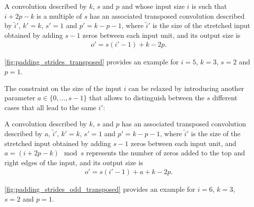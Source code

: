 \begin{relationship}\label{rel:padding_strides_transposed}
    A convolution described by $k$, $s$ and $p$ and whose
    input size $i$ is such that $i + 2p - k$ is a multiple of $s$ has an
    associated transposed convolution described by $\tilde{i}'$, $k' = k$, $s'
    = 1$ and $p' = k - p - 1$, where $\tilde{i}'$ is the size of the stretched
    input obtained by adding $s - 1$ zeros between each input unit, and its
    output size is
    \begin{equation*}
    \begin{split}
        o' = s (i' - 1) + k - 2p.
    \end{split}
    \end{equation*}
\end{relationship}

\noindent\autoref{fig:padding_strides_transposed} provides an example for $i =
5$, $k = 3$, $s = 2$ and $p = 1$.

The constraint on the size of the input $i$ can be relaxed by introducing
another parameter $a \in \{0, \ldots, s - 1\}$ that allows to distinguish
between the $s$ different cases that all lead to the same $i'$:

\begin{relationship}\label{rel:padding_strides_transposed_odd}
    A convolution described by $k$, $s$ and $p$ has an
    associated transposed convolution described by $a$, $\tilde{i}'$, $k' = k$,
    $s' = 1$ and $p' = k - p - 1$, where $\tilde{i}'$ is the size of the
    stretched input obtained by adding $s - 1$ zeros between each input unit,
    and $a = (i + 2p - k) \mod s$ represents the number of zeros added to the
    top and right edges of the input, and its output size is
    \begin{equation*}
    \begin{split}
        o' = s (i' - 1) + a + k - 2p.
    \end{split}
    \end{equation*}
\end{relationship}

\noindent\autoref{fig:padding_strides_odd_transposed} provides an example for
$i = 6$, $k = 3$, $s = 2$ and $p = 1$.

